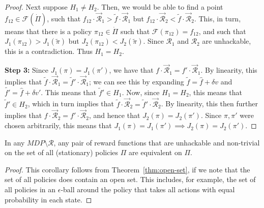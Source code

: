 \begin{proof}
Next suppose $H_1 \neq H_2$.
Then, we would be able to find a point $f_{12} \in \mathcal{F}(\dot{\Pi})$, such that $f_{12} \cdot \vec{\mathcal{R}}_1 > \tilde{f} \cdot \vec{\mathcal{R}}_1$ but $f_{12} \cdot \vec{\mathcal{R}}_2 < \tilde{f} \cdot \vec{\mathcal{R}}_2$. This, in turn, means that there is a policy $\pi_{12} \in \dot{\Pi}$ such that $\mathcal{F}(\pi_{12}) = f_{12}$, and such that $J_1(\pi_{12}) > J_1(\tilde{\pi})$ but $J_2(\pi_{12}) < J_2(\tilde{\pi})$. Since $\mathcal{R}_1$ and $\mathcal{R}_2$ are unhackable, this is a contradiction. Thus $H_1 = H_2$.


\textbf{Step 3:}
Since $J_1(\pi) = J_1(\pi')$, we have that $f \cdot \vec{\mathcal{R}}_1 = f' \cdot \vec{\mathcal{R}}_1$. 
By linearity, this implies that $\tilde{f}  %
\cdot \vec{\mathcal{R}}_1 = \tilde{f}' \cdot \vec{\mathcal{R}}_1$; we can see this by expanding $\tilde{f} = \hat{f} + \delta v$
and $\tilde{f'} = \hat{f} + \delta v'$. 
This means that $\tilde{f}' \in H_1$. 
Now, since $H_1 = H_2$, this means that $\tilde{f}' \in H_2$, which in turn implies that $\tilde{f} \cdot \vec{\mathcal{R}}_2 = \tilde{f}' \cdot \vec{\mathcal{R}}_2$. By linearity, this then further implies that $f \cdot \vec{\mathcal{R}}_2 = f' \cdot \vec{\mathcal{R}}_2$, and hence that $J_2(\pi) = J_2(\pi')$. 
Since $\pi,\pi'$ were chosen arbitrarily, this means that $J_1(\pi) = J_1(\pi') \implies J_2(\pi) = J_2(\pi')$.
\end{proof}















\begin{corollary}
In any $MDP \setminus \mathcal{R}$, any pair of reward functions that are unhackable and non-trivial on the set of all (stationary) policies $\Pi$ are equivalent on $\Pi$.
\end{corollary}
\begin{proof}
This corollary follows from Theorem~\ref{thm:open-set}, if we note that the set of all policies does contain an open set. This includes, for example, the set of all policies in an $\epsilon$-ball around the policy that takes all actions with equal probability in each state.
\end{proof}


